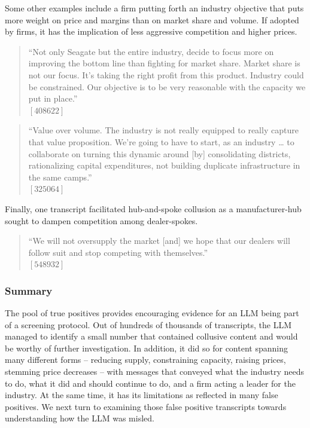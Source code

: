 Some other examples include a firm putting forth an industry objective that puts more weight on price and margins than on market share and volume. If adopted by firms, it has the implication of less aggressive competition and higher prices.

\begin{quote}
``Not only Seagate but the entire industry, decide to focus more on improving the bottom line than fighting for market share. Market share is not our focus. It's taking the right profit from this product. Industry could be constrained. Our objective is to be very reasonable with the capacity we put in place.'' \\
$[408622]$
\end{quote}

\begin{quote}
``Value over volume. The industry is not really equipped to really capture that value proposition. We're going to have to start, as an industry … to collaborate on turning this dynamic around [by] consolidating districts, rationalizing capital expenditures, not building duplicate infrastructure in the same camps.'' \\
$[325064]$
\end{quote}

Finally, one transcript facilitated hub-and-spoke collusion as a manufacturer-hub sought to dampen competition among dealer-spokes.

\begin{quote}
``We will not oversupply the market [and] we hope that our dealers will follow suit and stop competing with themselves.'' \\
$[548932]$
\end{quote}

\subsubsection*{Summary}
The pool of true positives provides encouraging evidence for an LLM being part of a screening protocol. Out of hundreds of thousands of transcripts, the LLM managed to identify a small number that contained collusive content and would be worthy of further investigation. In addition, it did so for content spanning many different forms – reducing supply, constraining capacity, raising prices, stemming price decreases – with messages that conveyed what the industry needs to do, what it did and should continue to do, and a firm acting a leader for the industry. At the same time, it has its limitations as reflected in many false positives. We next turn to examining those false positive transcripts towards understanding how the LLM was misled.

